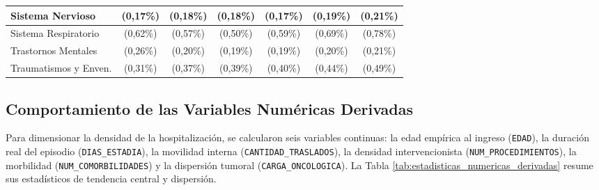 \begin{table}[htbp]
\begin{tabular}{|l|c|c|c|c|c|c|}
\parbox[t]{3.8cm}{Sistema Nervioso} & \parbox[t]{1.5cm}{ (0,17\%)} & \parbox[t]{1.5cm}{ (0,18\%)} & \parbox[t]{1.5cm}{ (0,18\%)} & \parbox[t]{1.5cm}{ (0,17\%)} & \parbox[t]{1.5cm}{ (0,19\%)} & \parbox[t]{1.5cm}{ (0,21\%)} \\ \hline
\parbox[t]{3.8cm}{Sistema Respiratorio} & \parbox[t]{1.5cm}{ (0,62\%)} & \parbox[t]{1.5cm}{ (0,57\%)} & \parbox[t]{1.5cm}{ (0,50\%)} & \parbox[t]{1.5cm}{ (0,59\%)} & \parbox[t]{1.5cm}{ (0,69\%)} & \parbox[t]{1.5cm}{ (0,78\%)} \\ \hline
\parbox[t]{3.8cm}{Trastornos Mentales} & \parbox[t]{1.5cm}{ (0,26\%)} & \parbox[t]{1.5cm}{ (0,20\%)} & \parbox[t]{1.5cm}{ (0,19\%)} & \parbox[t]{1.5cm}{ (0,19\%)} & \parbox[t]{1.5cm}{ (0,20\%)} & \parbox[t]{1.5cm}{ (0,21\%)} \\ \hline
\parbox[t]{3.8cm}{Traumatismos y Enven.} & \parbox[t]{1.5cm}{ (0,31\%)} & \parbox[t]{1.5cm}{ (0,37\%)} & \parbox[t]{1.5cm}{ (0,39\%)} & \parbox[t]{1.5cm}{ (0,40\%)} & \parbox[t]{1.5cm}{ (0,44\%)} & \parbox[t]{1.5cm}{ (0,49\%)} \\ \hline
\end{tabular}
\end{table}

\subsection{Comportamiento de las Variables Numéricas Derivadas}

Para dimensionar la densidad de la hospitalización, se calcularon seis variables continuas: la edad empírica al ingreso (\texttt{EDAD}), la duración real del episodio (\texttt{DIAS\_ESTADIA}), la movilidad interna (\texttt{CANTIDAD\_TRASLADOS}), la densidad intervencionista (\texttt{NUM\_PROCEDIMIENTOS}), la morbilidad (\texttt{NUM\_COMORBILIDADES}) y la dispersión tumoral (\texttt{CARGA\_ONCOLOGICA}). La Tabla \ref{tab:estadisticas_numericas_derivadas} resume sus estadísticos de tendencia central y dispersión.

